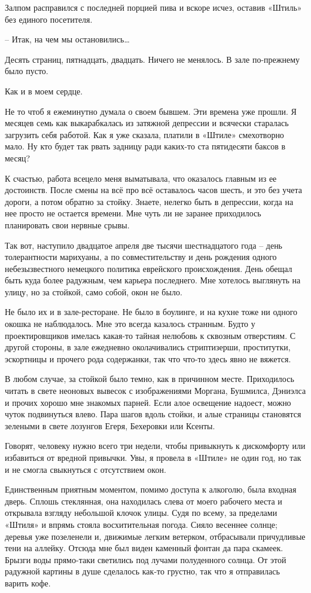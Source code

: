 \documentclass[
]{book}
\begin{document}
Залпом расправился с последней порцией пива и вскоре исчез, оставив «Штиль» без единого посетителя.

-- Итак, на чем мы остановились\ldots{}

Десять страниц, пятнадцать, двадцать. Ничего не менялось. В зале по-прежнему было пусто.

Как и в моем сердце.

Не то чтоб я ежеминутно думала о своем бывшем. Эти времена уже прошли. Я месяцев семь как выкарабкалась из затяжной депрессии и всячески старалась загрузить себя работой. Как я уже сказала, платили в «Штиле» смехотворно мало. Ну кто будет так рвать задницу ради каких-то ста пятидесяти баксов в месяц?

К счастью, работа всецело меня выматывала, что оказалось главным из ее достоинств. После смены на всё про всё оставалось часов шесть, и это без учета дороги, а потом обратно за стойку. Знаете, нелегко быть в депрессии, когда на нее просто не остается времени. Мне чуть ли не заранее приходилось планировать свои нервные срывы.

Так вот, наступило двадцатое апреля две тысячи шестнадцатого года -- день толерантности марихуаны, а по совместительству и день рождения одного небезызвестного немецкого политика еврейского происхождения. День обещал быть куда более радужным, чем карьера последнего. Мне хотелось выглянуть на улицу, но за стойкой, само собой, окон не было.

Не было их и в зале-ресторане. Не было в боулинге, и на кухне тоже ни одного окошка не наблюдалось. Мне это всегда казалось странным. Будто у проектировщиков имелась какая-то тайная нелюбовь к сквозным отверстиям. С другой стороны, в зале ежедневно околачивались стриптизерши, проститутки, эскортницы и прочего рода содержанки, так что что-то здесь явно не вяжется.

В любом случае, за стойкой было темно, как в причинном месте. Приходилось читать в свете неоновых вывесок с изображениями Моргана, Бушмилса, Дэниэлса и прочих хорошо мне знакомых парней. Если алое освещение надоест, можно чуток подвинуться влево. Пара шагов вдоль стойки, и алые страницы становятся зелеными в свете лозунгов Егеря, Бехеровки или Ксенты.

Говорят, человеку нужно всего три недели, чтобы привыкнуть к дискомфорту или избавиться от вредной привычки. Увы, я провела в «Штиле» не один год, но так и не смогла свыкнуться с отсутствием окон.

Единственным приятным моментом, помимо доступа к алкоголю, была входная дверь. Сплошь стеклянная, она находилась слева от моего рабочего места и открывала взгляду небольшой клочок улицы. Судя по всему, за пределами «Штиля» и впрямь стояла восхитительная погода. Сияло весеннее солнце; деревья уже позеленели и, движимые легким ветерком, отбрасывали причудливые тени на аллейку. Отсюда мне был виден каменный фонтан да пара скамеек. Брызги воды прямо-таки светились под лучами полуденного солнца. От этой радужной картины в душе сделалось как-то грустно, так что я отправилась варить кофе.
\end{document}
